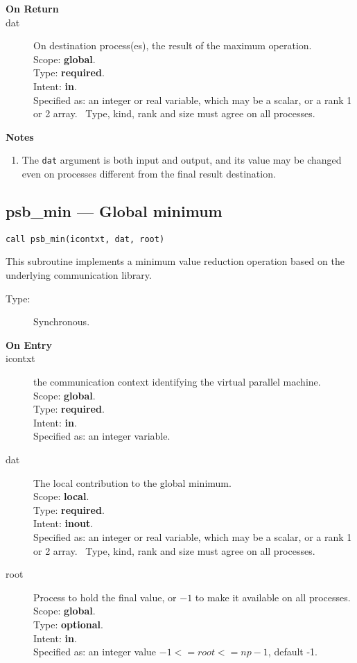 \begin{description}
\item[\bf On Return]
\item[dat] On destination process(es), the result of the maximum operation.\\
Scope: {\bf global}.\\
Type: {\bf required}.\\
Intent: {\bf in}.\\
Specified as: an integer or  real variable, which may be a
scalar, or a rank 1 or 2 array. \
Type, kind, rank and size must agree on all processes.
\end{description}


{\par\noindent\large\bfseries Notes}
\begin{enumerate}
\item The \verb|dat| argument is both input and output, and its
  value may be changed even on processes different from the final
  result destination.
\end{enumerate}

\clearpage\subsection*{psb\_min --- Global minimum}

\begin{verbatim}
call psb_min(icontxt, dat, root)
\end{verbatim}

This subroutine implements a minimum value reduction
operation based on the underlying communication library. 
\begin{description}
\item[Type:] Synchronous.
\item[\bf  On Entry ]
\item[icontxt] the communication context identifying the virtual
  parallel machine.\\
Scope: {\bf global}.\\
Type: {\bf required}.\\
Intent: {\bf in}.\\
Specified as: an integer variable.
\item[dat] The local contribution to the global minimum.\\
Scope: {\bf local}.\\
Type: {\bf required}.\\
Intent: {\bf inout}.\\
Specified as: an integer  or real variable, which may be a
scalar, or a rank 1 or 2 array. \
Type, kind, rank and size must agree on all processes.
\item[root] Process to hold the final value, or $-1$ to make it available
  on all processes.\\
Scope: {\bf global}.\\
Type: {\bf optional}.\\
Intent: {\bf in}.\\
Specified as: an integer value $-1<= root <= np-1$, default -1. \\
\end{description}


